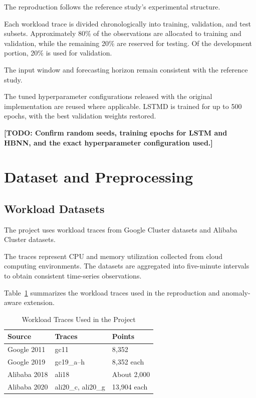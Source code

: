 \documentclass[conference]{IEEEtran}
\newcommand{\todo}[1]{{\color{red}\textbf{[TODO: #1]}}}
\begin{document}
The reproduction follows the reference study's experimental structure.

Each workload trace is divided chronologically into training, validation, and test subsets. Approximately 80\% of the observations are allocated to training and validation, while the remaining 20\% are reserved for testing. Of the development portion, 20\% is used for validation.

The input window and forecasting horizon remain consistent with the reference study.

The tuned hyperparameter configurations released with the original implementation are reused where applicable. LSTMD is trained for up to 500 epochs, with the best validation weights restored.

\todo{Confirm random seeds, training epochs for LSTM and HBNN, and the exact hyperparameter configuration used.}

\section{Dataset and Preprocessing}

\subsection{Workload Datasets}

The project uses workload traces from Google Cluster datasets and Alibaba Cluster datasets.

The traces represent CPU and memory utilization collected from cloud computing environments. The datasets are aggregated into five-minute intervals to obtain consistent time-series observations.

Table~\ref{tab:traces} summarizes the workload traces used in the reproduction and anomaly-aware extension.

\begin{table}[!t]
\caption{Workload Traces Used in the Project}
\label{tab:traces}
\centering
\footnotesize
\begin{tabular}{p{}p{}p{}}
\toprule
\textbf{Source} & \textbf{Traces} & \textbf{Points}\\
\midrule
Google 2011 & gc11 & 8,352\\
Google 2019 & gc19\_a--h & 8,352 each\\
Alibaba 2018 & ali18 & About 2,000\\
Alibaba 2020 & ali20\_c, ali20\_g & 13,904 each\\
\bottomrule
\end{tabular}
\end{table}
\end{document}
